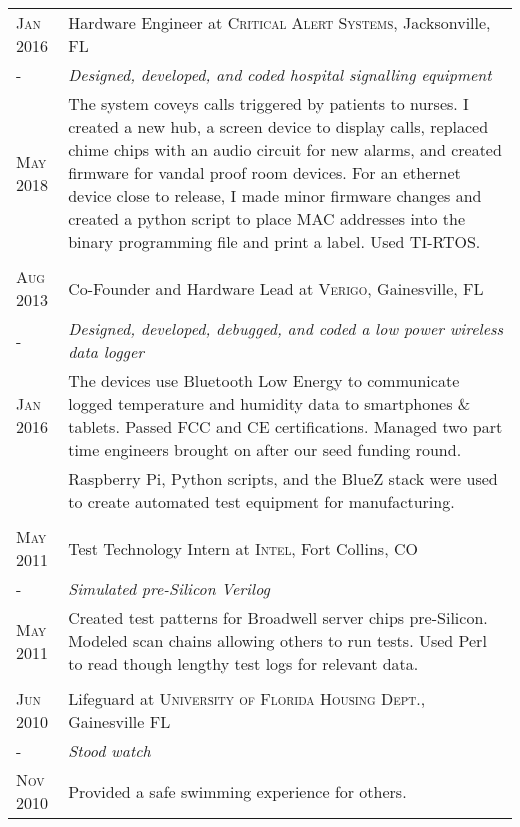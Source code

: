 \documentclass[a4paper,10pt]{article} %
\begin{document}
\begin{tabular}{p{1.5cm}|p{12.5cm}}


\centering\textsc{Jan 2016} &  Hardware Engineer at \textsc{Critical Alert Systems}, Jacksonville, FL \\
\centering - & \emph{Designed, developed, and coded hospital signalling equipment}\\
\centering\textsc{May 2018} & \footnotesize{The system coveys calls triggered by patients to nurses. I created a new hub, a screen device to display calls, replaced chime chips with an audio circuit for new alarms, and created firmware for vandal proof room devices. For an ethernet device close to release, I made minor firmware changes and created a python script to place MAC addresses into the binary programming file and print a label. Used TI-RTOS.}\\
\multicolumn{2}{c}{} \\

\centering\textsc{Aug 2013} &  Co-Founder and Hardware Lead at \textsc{Verigo}, Gainesville, FL \\
\centering\textsc{-}& \emph{Designed, developed, debugged, and coded a low power wireless data logger }\\
\centering\textsc{Jan 2016}&\footnotesize{The devices use Bluetooth Low Energy to communicate logged temperature and humidity data to smartphones \& tablets. Passed FCC and CE certifications. Managed two part time engineers brought on after our seed funding round. }\\
&\footnotesize{Raspberry Pi, Python scripts, and the BlueZ stack were used to create automated test equipment for manufacturing.}\\
\multicolumn{2}{c}{} \\


\centering\textsc{May 2011} & Test Technology Intern at \textsc{Intel}, Fort Collins, CO \emph{}\\
\centering\textsc{-}& \emph{Simulated pre-Silicon Verilog}\\
\centering\textsc{May 2011}&\footnotesize{Created test patterns for Broadwell server chips pre-Silicon. Modeled scan chains allowing others to run tests. Used Perl to read though lengthy test logs for relevant data.}\\
\multicolumn{2}{c}{} \\


\centering\textsc{Jun 2010} & Lifeguard at \textsc{University of Florida Housing Dept.}, Gainesville FL \\
\centering\textsc{-} & \emph{Stood watch}\\
\centering\textsc{Nov 2010}& \footnotesize{Provided a safe swimming experience for others.}\\
\end{tabular}
\end{document}
